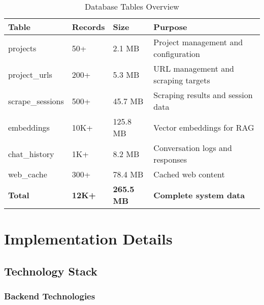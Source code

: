 \documentclass[12pt,a4paper]{report}
\begin{document}
\begin{table}[H]
    \centering
    \caption{Database Tables Overview}
    \label{tab:database-tables}
    \begin{tabular}{|l|l|l|p{4cm}|}
        \hline
        \textbf{Table} & \textbf{Records} & \textbf{Size} & \textbf{Purpose} \\
        \hline
        projects & 50+ & 2.1 MB & Project management and configuration \\
        \hline
        project\_urls & 200+ & 5.3 MB & URL management and scraping targets \\
        \hline
        scrape\_sessions & 500+ & 45.7 MB & Scraping results and session data \\
        \hline
        embeddings & 10K+ & 125.8 MB & Vector embeddings for RAG \\
        \hline
        chat\_history & 1K+ & 8.2 MB & Conversation logs and responses \\
        \hline
        web\_cache & 300+ & 78.4 MB & Cached web content \\
        \hline
        \textbf{Total} & \textbf{12K+} & \textbf{265.5 MB} & \textbf{Complete system data} \\
        \hline
    \end{tabular}
\end{table}

\chapter{Implementation Details}

\section{Technology Stack}

\subsection{Backend Technologies}
\end{document}
